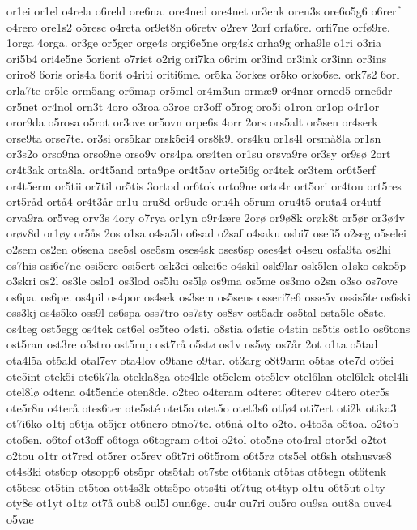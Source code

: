 {or1ei
or1el
o4rela
o6reld
ore6na.
ore4ned
ore4net
or3enk
oren3s
ore6o5g6
o6rerf
o4rero
ore1s2
o5resc
o4reta
or9et8n
o6retv
o2rev
2orf
orfa6re.
orfi7ne
orf^^f89re.
1orga
4orga.
or3ge
or5ger
orge4s
orgi6e5ne
org4sk
orha9g
orha9le
o1ri
o3ria
ori5b4
ori4e5ne
5orient
o7riet
o2rig
ori7ka
o6rim
or3ind
or3ink
or3inn
or3ins
oriro8
6oris
oris4a
6orit
o4riti
oriti6me.
or5ka
3orkes
or5ko
orko6se.
ork7s2
6orl
orla7te
or5le
orm5ang
or6map
or5mel
or4m3un
orm^^e69
or4nar
orned5
orne6dr
or5net
or4nol
orn3t
4oro
o3roa
o3roe
or3off
o5rog
oro5i
o1ron
or1op
o4r1or
oror9da
o5rosa
o5rot
or3ove
or5ovn
orpe6s
4orr
2ors
ors5alt
or5sen
or4serk
orse9ta
orse7te.
or3si
ors5kar
orsk5ei4
ors8k9l
ors4ku
or1s4l
orsm^^e58la
or1sn
or3s2o
orso9na
orso9ne
orso9v
ors4pa
ors4ten
or1su
orsva9re
or3sy
or9s^^f8
2ort
or4t3ak
orta8la.
or4t5and
orta9pe
or4t5av
orte5i6g
or4tek
or3tem
or6t5erf
or4t5erm
or5tii
or7til
or5tis
3ortod
or6tok
orto9ne
orto4r
ort5ori
or4tou
ort5res
ort5r^^e5d
ort^^e54
or4t3^^e5r
or1u
oru8d
or9ude
oru4h
o5rum
oru4t5
oruta4
or4utf
orva9ra
or5veg
orv3s
4ory
o7rya
or1yn
o9r4^^e6re
2or^^f8
or9^^f88k
or^^f8k8t
or5^^f8r
or3^^f84v
or^^f8v8d
or1^^f8y
or5^^e5s
2os
o1sa
o4sa5b
o6sad
o2saf
o4saku
osbi7
osefi5
o2seg
o5selei
o2sem
os2en
o6sena
ose5sl
ose5sm
oses4sk
oses6sp
oses4st
o4seu
osfa9ta
os2hi
os7his
osi6e7ne
osi5ere
osi5ert
osk3ei
oskei6e
o4skil
osk9lar
osk5len
o1sko
osko5p
o3skri
os2l
os3le
oslo1
os3lod
os5lu
os5l^^f8
os9ma
os5me
os3mo
o2sn
o3so
os7ove
os6pa.
os6pe.
os4pil
os4por
os4sek
os3sem
os5sens
osseri7e6
osse5v
ossis5te
os6ski
oss3kj
os4s5ko
oss9l
os6spa
oss7tro
os7sty
os8sv
ost5adr
os5tal
osta5le
o8ste.
os4teg
ost5egg
os4tek
ost6el
os5teo
o4sti.
o8stia
o4stie
o4stin
os5tis
ost1o
os6tons
ost5ran
ost3re
o3stro
ost5rup
ost7r^^e5
o5st^^f8
os1v
os5^^f8y
os7^^e5r
2ot
o1ta
o5tad
ota4l5a
ot5ald
otal7ev
ota4lov
o9tane
o9tar.
ot3arg
o8t9arm
o5tas
ote7d
ot6ei
ote5int
otek5i
ote6k7la
otekla8ga
ote4kle
ot5elem
ote5lev
otel6lan
otel6lek
otel4li
otel8l^^f8
o4tena
o4t5ende
oten8de.
o2teo
o4teram
o4teret
o6terev
o4tero
oter5s
ote5r8u
o4ter^^e5
otes6ter
ote5st^^e9
otet5a
otet5o
otet3s6
otf^^f84
oti7ert
oti2k
otika3
ot7i6ko
o1tj
o6tja
ot5jer
ot6nero
otno7te.
ot6n^^e5
o1to
o2to.
o4to3a
o5toa.
o2tob
oto6en.
o6tof
ot3off
o6toga
o6togram
o4toi
o2tol
oto5ne
oto4ral
otor5d
o2tot
o2tou
o1tr
ot7red
ot5rer
ot5rev
o6t7ri
o6t5rom
o6t5r^^f8
ots5el
ot6sh
otshusv^^e68
ot4s3ki
ots6op
otsopp6
ots5pr
ots5tab
ot7ste
ot6tank
ot5tas
ot5tegn
ot6tenk
ot5tese
ot5tin
ot5toa
ott4s3k
otts5po
otts4ti
ot7tug
ot4typ
o1tu
o6t5ut
o1ty
oty8e
ot1yt
o1t^^f8
ot7^^e5
oub8
oul5l
oun6ge.
ou4r
ou7ri
ou5ro
ou9sa
out8a
ouve4
o5vae
}

